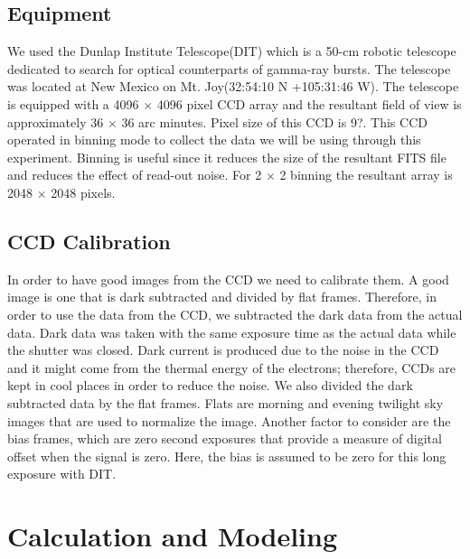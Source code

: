 \documentclass[letterpaper,12pt]{article}
\begin{document}
\subsection{Equipment}
We used the Dunlap Institute Telescope(DIT) which is a 50-cm robotic telescope dedicated to search for optical counterparts of gamma-ray bursts. The telescope was located at New Mexico on Mt. Joy(32:54:10 N +105:31:46 W). The telescope is equipped with a 4096 \begin{math}\times\end{math} 4096 pixel CCD array and the resultant field of view is approximately 36 \begin{math}\times\end{math} 36 arc minutes. Pixel size of this CCD is 9?. This CCD operated in binning mode to collect the data we will be using through this experiment. Binning is useful since it reduces the size of the resultant FITS file and reduces the effect of read-out noise. For 2 \begin{math}\times\end{math} 2 binning the resultant array is 2048 \begin{math}\times\end{math} 2048 pixels.

\subsection{CCD Calibration}
In order to have good images from the CCD we need to calibrate them. A good image is one that is dark subtracted and divided by flat frames. Therefore, in order to use the data from the CCD, we subtracted the dark data from the actual data. Dark data was taken with the same exposure time as the actual data while the shutter was closed. Dark current is produced due to the noise in the CCD and it might come from the thermal energy of the electrons; therefore, CCDs are kept in cool places in order to reduce the noise. We also divided the dark subtracted data by the flat frames. Flats are morning and evening twilight sky images that are used to normalize the image. Another factor to consider are the bias frames, which are zero second exposures that provide a measure of digital offset when the signal is zero. Here, the bias is assumed to be zero for this long exposure with DIT.



\section{Calculation and Modeling}
\end{document}
